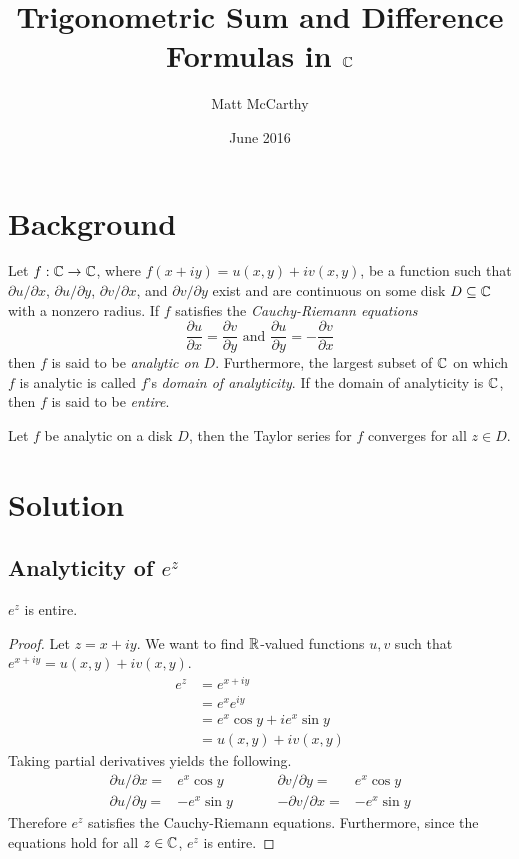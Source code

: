 \documentclass[notitlepage]{problem-solving}
\author{Matt McCarthy}
\title{Trigonometric Sum and Difference Formulas in $\mathbb{C}$}
\date{June 2016}
\begin{document}
\maketitle

\section{Background}

\begin{definition}
	Let $f:\mathbb{C}\rightarrow\mathbb{C}$, where $f(x+iy)=u(x,y)+iv(x,y)$, be a function such that $\partial u/\partial x$, $\partial u/\partial y$, $\partial v/\partial x$, and $\partial v/\partial y$ exist and are continuous on some disk $D\subseteq\mathbb{C}$ with a nonzero radius.
	If $f$ satisfies the \textit{Cauchy-Riemann equations}
	\[
		\frac{\partial u}{\partial x} = \frac{\partial v}{\partial y} \text{ and } \frac{\partial u}{\partial y} = -\frac{\partial v}{\partial x}
	\]
	then $f$ is said to be \textit{analytic on $D$}.
	Furthermore, the largest subset of $\mathbb{C}$ on which $f$ is analytic is called $f$'s \textit{domain of analyticity}.
	If the domain of analyticity is $\mathbb{C}$, then $f$ is said to be \textit{entire}.
\end{definition}

\begin{thm}
	Let $f$ be analytic on a disk $D$, then the Taylor series for $f$ converges for all $z\in D$.
\end{thm}

\section{Solution}

\subsection{Analyticity of $e^{z}$}

\begin{proposition}
	$e^z$ is entire.
\end{proposition}
\begin{proof}
	Let $z=x+iy$.
	We want to find $\mathbb{R}$-valued functions $u,v$ such that $e^{x+iy}=u(x,y)+iv(x,y)$.
	\begin{align*}
		e^z &= e^{x+iy}\\
		&= e^x e^{iy}\\
		&= e^x \cos y + ie^x\sin y\\
		&= u(x,y) +iv(x,y)
	\end{align*}
	Taking partial derivatives yields the following.
	\[
		\begin{array}{rlrl}
			\partial u/\partial x =& e^x \cos y  \hspace{1cm}&  \partial v/\partial y =& e^x \cos y\\
			\partial u/\partial y =& -e^x \sin y \hspace{1cm}& -\partial v/\partial x =& -e^x \sin y
		\end{array}
	\]
	Therefore $e^z$ satisfies the Cauchy-Riemann equations.
	Furthermore, since the equations hold for all $z\in\mathbb{C}$, $e^z$ is entire.
\end{proof}
\end{document}

